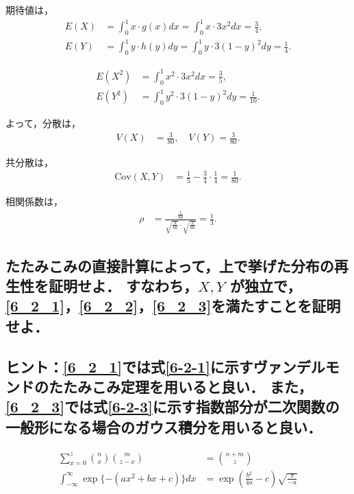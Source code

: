 \documentclass[titlepage,a4paper]{jsarticle}
\begin{document}
期待値は，
\begin{align*}
  E(X) & = \int_0^1 x \cdot g(x)dx = \int_0^1 x \cdot 3x^2 dx = \frac{3}{4},       \\
  E(Y) & = \int_0^1 y \cdot h(y)dy = \int_0^1 y \cdot 3(1 - y)^2 dy = \frac{1}{4}.
\end{align*}

\begin{align*}
  E(X^2) & = \int_0^1 x^2 \cdot 3x^2 dx = \frac{3}{5},        \\
  E(Y^2) & = \int_0^1 y^2 \cdot 3(1 - y)^2 dy = \frac{1}{10}.
\end{align*}

よって，分散は，
\begin{align*}
  V(X) & = \frac{3}{80}, \quad V(Y) = \frac{3}{80}.
\end{align*}

共分散は，
\begin{align*}
  \text{Cov}(X, Y) & = \frac{1}{5} - \frac{3}{4} \cdot \frac{1}{4} = \frac{1}{80}.
\end{align*}

相関係数は，
\begin{align*}
  \rho & = \frac{\frac{1}{80}}{\sqrt{\frac{3}{80}} \cdot \sqrt{\frac{3}{80}}} = \frac{1}{3}.
\end{align*}

\subsection{たたみこみの直接計算によって，上で挙げた分布の再生性を証明せよ．
  すなわち，$X, Y$ が独立で，\ref{6_2_1}，\ref{6_2_2}，\ref{6_2_3}を満たすことを証明せよ．}
\subsection*{ヒント：\ref{6_2_1}では式\eqref{6-2-1}に示すヴァンデルモンドのたたみこみ定理を用いると良い．
  また，\ref{6_2_3}では式\eqref{6-2-3}に示す指数部分が二次関数の一般形になる場合のガウス積分を用いると良い．}
\begin{align}
  \sum_{x=0}^{z} \binom{n}{x} \binom{m}{z-x}                     & = \binom{n+m}{z} \label{6-2-1}                                           \\
  \int_{-\infty}^{\infty} \exp\{-\left(ax^2 + bx + c\right)\} dx & = \exp\left(\frac{b^2}{4a} - c\right)\sqrt{\frac{\pi}{-a}} \label{6-2-3}
\end{align}
\end{document}
